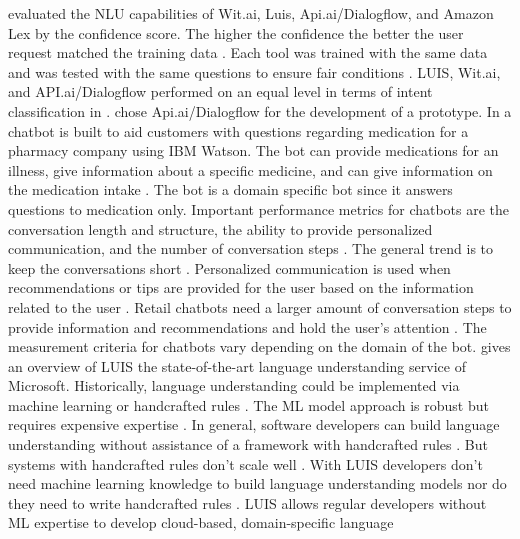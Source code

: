 \citet{gregori2017evaluation} evaluated the NLU capabilities of Wit.ai, Luis, Api.ai/Dialogflow, and Amazon Lex\cite{lexconversational}
by the confidence score. 
The higher the confidence the better the user request matched the training data \cite{gregori2017evaluation}.
Each tool was trained with the same data and was tested with the same questions to ensure fair conditions \cite{gregori2017evaluation}.
LUIS, Wit.ai, and API.ai/Dialogflow performed on an equal level in terms of intent classification in \citet{gregori2017evaluation}.
\citet{gregori2017evaluation} chose Api.ai/Dialogflow for the development of a prototype.
In \citet{pharmacybot} a chatbot is built to aid customers with questions regarding medication for a 
pharmacy company using IBM Watson.
The bot can provide medications for an illness, give information about a specific medicine, and can 
give information on the medication intake \cite{pharmacybot}.
The bot is a domain specific bot since it answers questions to medication only.
Important performance metrics for chatbots are the conversation length and structure, the ability to 
provide personalized communication, and the number of conversation steps \cite{PRZEGALINSKA2019785}.
The general trend is to keep the conversations short \cite{PRZEGALINSKA2019785}.
Personalized communication is used when recommendations or tips are provided for the user based on the 
information related to the user \cite{PRZEGALINSKA2019785}.
Retail chatbots need a larger amount of conversation steps to provide information and recommendations 
and hold the user's attention \cite{PRZEGALINSKA2019785}.
The measurement criteria for chatbots vary depending on the domain of the bot.
\citet{luis2015williams} gives an overview of LUIS the state-of-the-art language understanding service of Microsoft.
Historically, language understanding could be implemented via machine learning or handcrafted rules \cite{luis2015williams}.
The ML model approach is robust but requires expensive expertise \cite{luis2015williams}. 
In general, software developers can build language understanding without assistance of a framework
with handcrafted rules \cite{luis2015williams}. 
But systems with handcrafted rules don't scale well \cite{luis2015williams}.
With LUIS developers don't need machine learning knowledge to build language understanding models 
nor do they need to write handcrafted rules \cite{luis2015williams}.
LUIS allows regular developers without ML expertise to develop cloud-based, domain-specific language 
